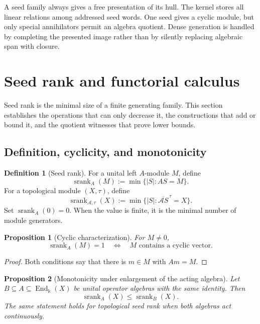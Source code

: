 \documentclass[11pt]{article}
\newtheorem{proposition}[proposition]{Proposition}
\theoremstyle{definition}
\newtheorem{definition}[definition]{Definition}
\theoremstyle{remark}
\theoremstyle{definition}\newtheorem{example}[theorem]{Example}
\newcommand{\bbk}{\Bbbk}
\newcommand{\A}{\mathcal A}
\newcommand{\srank}{\operatorname{srank}}
\newcommand{\End}{\operatorname{End}}
\newcommand{\cl}[1]{\overline{#1}}
\newcommand{\RecordID}[1]{\label{record:#1}}
\newcommand{\Depends}[1]{}
\begin{document}
\begin{sectionrecap}
A seed family always gives a free presentation of its hull.  The kernel stores all linear relations among addressed seed words.  One seed gives a cyclic module, but only special annihilators permit an algebra quotient.  Dense generation is handled by completing the presented image rather than by silently replacing algebraic span with closure.
\end{sectionrecap}

\section{Seed rank and functorial calculus}



\begin{readerroadmap}
Seed rank is the minimal size of a finite generating family.  This section establishes the operations that can only decrease it, the constructions that add or bound it, and the quotient witnesses that prove lower bounds.
\end{readerroadmap}
\subsection{Definition, cyclicity, and monotonicity}

\begin{definition}[Seed rank]
\label{def:seed-rank}
For a unital left $A$-module $M$, define
\[
\srank_A(M):=\min\{|S|:AS=M\}.
\]
For a topological module $(X,\tau)$, define
\[
\srank_{\A,\tau}(X):=\min\{|S|:\cl{\A S}^{\,\tau}=X\}.
\]
Set $\srank_A(0)=0$.  When the value is finite, it is the minimal number of module generators.
\end{definition}
\RecordID{PSC-I-D-SEED-RANK}

\begin{proposition}[Cyclic characterization]
\label{prop:cyclic-characterization}
For $M\neq0$,
\[
\srank_A(M)=1
\quad\Longleftrightarrow\quad
M\text{ contains a cyclic vector}.
\]
\end{proposition}
\RecordID{PSC-I-P-CYCLIC-CHARACTERIZATION}
\Depends{PSC-I-D-SEED-RANK.}

\begin{proof}
Both conditions say that there is $m\in M$ with $Am=M$.
\end{proof}

\begin{proposition}[Monotonicity under enlargement of the acting algebra]
\label{prop:acting-algebra-monotonicity}
Let $B\subseteq A\subseteq\End_{\bbk}(X)$ be unital operator algebras with the same identity.  Then
\[
\boxed{\srank_A(X)\leq\srank_B(X).}
\]
The same statement holds for topological seed rank when both algebras act continuously.
\end{proposition}
\RecordID{PSC-I-P-ACTING-ALGEBRA-MONOTONICITY}
\Depends{PSC-I-D-SEED-RANK.}
\end{document}
